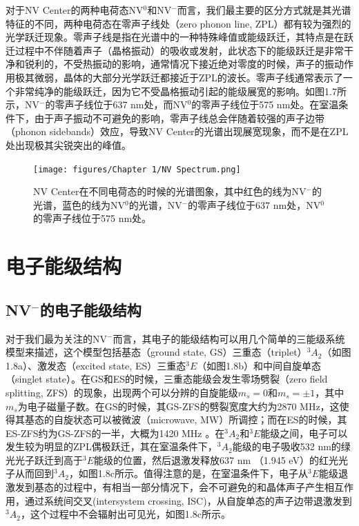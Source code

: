 \documentclass[type = bachelor]{whu-thesis}
\begin{document}
对于NV Center的两种电荷态NV$^0$和NV$^-$而言，我们最主要的区分方式就是其光谱特征的不同，两种电荷态在零声子线处（zero phonon line, ZPL）都有较为强烈的光学跃迁现象。零声子线是指在光谱中的一种特殊峰值或能级跃迁，其特点是在跃迁过程中不伴随着声子（晶格振动）的吸收或发射，此状态下的能级跃迁是非常干净和锐利的，不受热振动的影响，通常情况下接近绝对零度的时候，声子的振动作用极其微弱，晶体的大部分光学跃迁都接近于ZPL的波长。零声子线通常表示了一个非常纯净的能级跃迁，因为它不受晶格振动引起的能级展宽的影响。如图1.7所示，NV$^-$的零声子线位于637 nm处，而NV$^0$的零声子线位于575 nm处。在室温条件下，由于声子振动不可避免的影响，零声子线总会伴随着较强的声子边带（phonon sidebands）效应，导致NV Center的光谱出现展宽现象，而不是在ZPL处出现极其尖锐突出的峰值。

\begin{figure}
  \centering
  \texttt{[image: figures/Chapter 1/NV Spectrum.png]}
  \caption{NV Center在不同电荷态的时候的光谱图象，其中红色的线为NV$^-$的光谱，蓝色的线为NV$^0$的光谱，NV$^-$的零声子线位于637 nm处，NV$^0$的零声子线位于575 nm处。}
  \label{fig:NV Spectrum}
\end{figure}

\section{电子能级结构}

\subsection{NV$^-$的电子能级结构}
对于我们最为关注的NV$^-$而言，其电子的能级结构可以用几个简单的三能级系统模型来描述，这个模型包括基态（ground state, GS）三重态（triplet）$^3A_2$（如图1.8a）、激发态（excited state, ES）三重态$^3E$（如图1.8b）和中间自旋单态（singlet state）。在GS和ES的时候，三重态能级会发生零场劈裂（zero field splitting, ZFS）的现象，出现两个可以分辨的自旋能级$m_s=0$和$m_s=±1$，其中$m_s$为电子磁量子数。在GS的时候，其GS-ZFS的劈裂宽度大约为2870 \unit{\MHz}，这使得其基态的自旋状态可以被微波（microwave, MW）所调控；而在ES的时候，其ES-ZFS约为GS-ZFS的一半，大概为1420 \unit{\MHz} \cite{gruber1997scanning,neumann2009excited}。在$^3A_2$和$^3E$能级之间，电子可以发生较为明显的ZPL偶极跃迁，其在室温条件下，$^3A_2$能级的电子吸收532 nm的绿光光子跃迁到高于$^3E$能级的位置，然后退激发释放637 nm （1.945 \unit{\eV}）的红光光子从而回到$^3A_2$，如图1.8c所示。值得注意的是，在室温条件下，电子从$^3E$能级退激发到基态的过程中，有相当一部分情况下，会不可避免的和晶体声子产生相互作用，通过系统间交叉(intersystem crossing, ISC)，从自旋单态的声子边带退激发到$^3A_2$，这个过程中不会辐射出可见光，如图1.8c所示。
\end{document}
